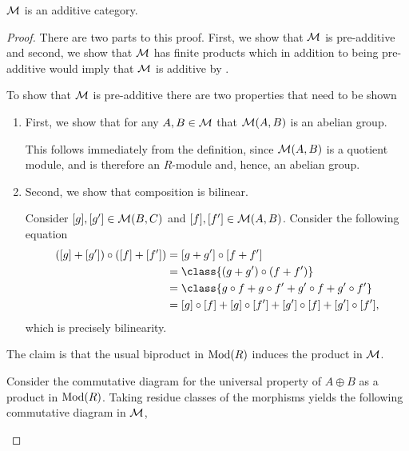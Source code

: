 \begin{lemma}
    \( {\mathcal{M}} \) is an additive category.
\end{lemma}
\begin{proof}
    There are two parts to this proof. First, we show that \( {\mathcal{M}} \) is pre-additive and second, we show that \( {\mathcal{M}} \) has finite products which in addition to being pre-additive would imply that \( {\mathcal{M}} \) is additive by \cite[p. 251]{Mac_Lane_1995}.

    To show that \( {\mathcal{M}} \) is pre-additive there are two properties that need to be shown
    \begin{enumerate}
        \item {
            First, we show that for any \( A, B \in {\mathcal{M}} \) that \( {\mathcal{M}}(A, B) \) is an abelian group.

            This follows immediately from the definition, since \( {\mathcal{M}}(A, B) \) is a quotient module, and is therefore an \( R \)-module and, hence, an abelian group.
        }
        \item {
            Second, we show that composition is bilinear.

            Consider \( [g], [g'] \in {\mathcal{M}}(B, C) \) and \( [f], [f'] \in {\mathcal{M}}(A, B) \). Consider the following equation
            \begin{align*}
                ([g] + [g']) \circ ([f] + [f']) &= [g + g'] \circ [f + f'] \\
                &= \class{(g + g') \circ (f + f')} \\
                &= \class{g \circ f + g \circ f' + g' \circ f + g' \circ f'} \\
                &= [g] \circ [f] + [g] \circ [f'] + [g'] \circ [f] + [g'] \circ [f'],
            \end{align*}
            which is precisely bilinearity.
        }
    \end{enumerate}

    The claim is that the usual biproduct in \( \operatorname{Mod}(R) \) induces the product in \( {\mathcal{M}} \).
    
    Consider the commutative diagram for the universal property of \( A \oplus B \) as a product in \( \operatorname{Mod}(R) \). Taking residue classes of the morphisms yields the following commutative diagram in \( {\mathcal{M}} \),
    \begin{center}
\end{center}
\end{proof}
